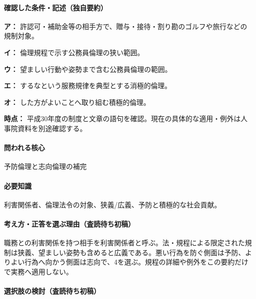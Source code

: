 \paragraph{確認した条件・記述（独自要約）}\mbox{}\par

\noindent\textbf{ア：} 許認可・補助金等の相手方で、贈与・接待・割り勘のゴルフや旅行などの規制対象。\par

\noindent\textbf{イ：} 倫理規程で示す公務員倫理の狭い範囲。\par

\noindent\textbf{ウ：} 望ましい行動や姿勢まで含む公務員倫理の範囲。\par

\noindent\textbf{エ：} するなという服務規律を典型とする消極的倫理。\par

\noindent\textbf{オ：} した方がよいことへ取り組む積極的倫理。\par

\noindent\textbf{時点：} 平成30年度の制度と文章の語句を確認。現在の具体的な適用・例外は人事院資料を別途確認する。\par

\paragraph{問われる核心} 予防倫理と志向倫理の補完

\paragraph{必要知識} 利害関係者、倫理法令の対象、狭義/広義、予防と積極的な社会貢献。

\paragraph{考え方・正答を選ぶ理由（査読待ち初稿）} 職務との利害関係を持つ相手を利害関係者と呼ぶ。法・規程による限定された規制は狭義、望ましい姿勢も含めると広義である。悪い行為を防ぐ側面は予防、よりよい行為へ向かう側面は志向で、4を選ぶ。規程の詳細や例外をこの要約だけで実務へ適用しない。

\paragraph{選択肢の検討（査読待ち初稿）}\mbox{}\par

